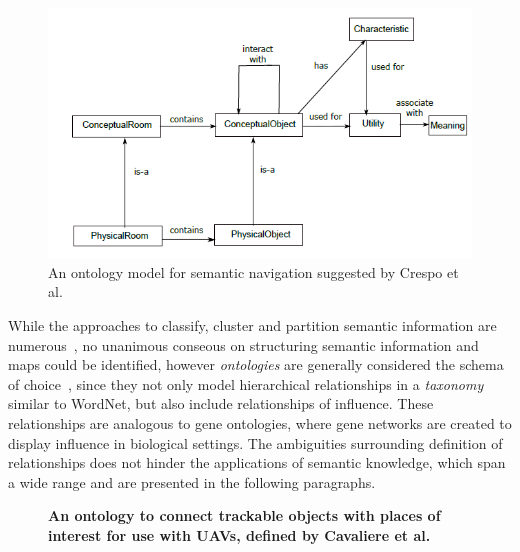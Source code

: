 \documentclass[a4paper,12pt]{article}
\theoremstyle{mytheor}
\begin{document}
\begin{figure}[t]
\centering
\includegraphics[]{1-2-Crespo-OnotologyForSemNavigation.png}
\caption{An ontology model for semantic navigation suggested by Crespo et al.~\cite{crespo_reasoning_2018}}
\label{fig:LitMapsCrespo}
\end{figure}
While the approaches to classify, cluster and partition semantic information are numerous~\cite{saffiotti_robots_2011,galindo_robot_2008,crespo_reasoning_2018,tenorth_knowrob-map_2010,cavaliere_empowering_2018,alirezaie_exploiting_2017}, no unanimous conseous on structuring semantic information and maps could be identified, however \textit{ontologies} are generally considered the schema of choice~\cite{kostavelis_semantic_2015}, since they not only model hierarchical relationships in a \textit{taxonomy} similar to WordNet, but also include relationships of influence. These relationships are analogous to gene ontologies, where gene networks are created to display influence in biological settings. The ambiguities surrounding definition of relationships does not hinder the applications of semantic knowledge, which span a wide range and are presented in the following paragraphs.
\begin{figure}[b]
\centering
{}
\caption{\bf{An ontology to connect trackable objects with places of interest for use with UAVs, defined by Cavaliere et al.~\cite{cavaliere_empowering_2018}}}
\label{fig:LitMapsCavaliere}
\end{figure} 
\end{document}
